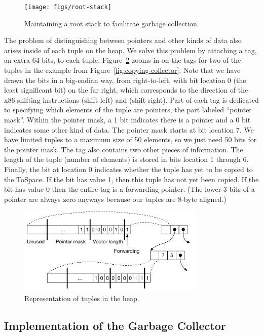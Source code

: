 \documentclass[7x10]{TimesAPriori_MIT}%
\begin{document}
\begin{figure}[tbp]
\centering \texttt{[image: figs/root-stack]}
\caption{Maintaining a root stack to facilitate garbage collection.}
\label{fig:shadow-stack}
\end{figure}

The problem of distinguishing between pointers and other kinds of data
also arises inside of each tuple on the heap. We solve this problem by
attaching a tag, an extra 64-bits, to each
tuple. Figure~\ref{fig:tuple-rep} zooms in on the tags for two of the
tuples in the example from Figure~\ref{fig:copying-collector}. Note
that we have drawn the bits in a big-endian way, from right-to-left,
with bit location 0 (the least significant bit) on the far right,
which corresponds to the direction of the x86 shifting instructions
 (shift left) and  (shift right). Part of each tag
is dedicated to specifying which elements of the tuple are pointers,
the part labeled ``pointer mask''. Within the pointer mask, a 1 bit
indicates there is a pointer and a 0 bit indicates some other kind of
data. The pointer mask starts at bit location 7. We have limited
tuples to a maximum size of 50 elements, so we just need 50 bits for
the pointer mask. The tag also contains two other pieces of
information. The length of the tuple (number of elements) is stored in
bits location 1 through 6. Finally, the bit at location 0 indicates
whether the tuple has yet to be copied to the ToSpace.  If the bit has
value 1, then this tuple has not yet been copied.  If the bit has
value 0 then the entire tag is a forwarding pointer. (The lower 3 bits
of a pointer are always zero anyways because our tuples are 8-byte
aligned.)

\begin{figure}[tbp]
\centering \includegraphics[width=0.8\textwidth]{figs/tuple-rep}
\caption{Representation of tuples in the heap.}
\label{fig:tuple-rep}
\end{figure}

\subsection{Implementation of the Garbage Collector}
\label{sec:organize-gz}
\end{document}
